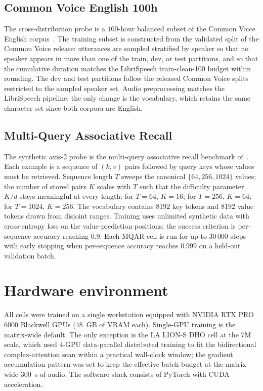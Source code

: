 \subsection{Common Voice English 100h}\label{app:setup:cv}

The cross-distribution probe is a $100$-hour balanced subset of the
Common Voice English corpus~\cite{ardila2019commonvoice}. The
training subset is constructed from the validated split of the
Common Voice release: utterances are sampled stratified by speaker
so that no speaker appears in more than one of the train, dev, or
test partitions, and so that the cumulative duration matches the
LibriSpeech train-clean-100 budget within rounding. The dev and test
partitions follow the released Common Voice splits restricted to the
sampled speaker set. Audio preprocessing matches the LibriSpeech
pipeline; the only change is the vocabulary, which retains the same
character set since both corpora are English.

\subsection{Multi-Query Associative Recall}\label{app:setup:mqar}

The synthetic axis-2 probe is the multi-query associative recall
benchmark of~\citet{arora2023zoology}. Each example is a sequence
of $(k, v)$ pairs followed by query keys whose values must be
retrieved. Sequence length $T$ sweeps the canonical $\{64, 256,
1024\}$ values; the number of stored pairs $K$ scales with $T$ such
that the difficulty parameter $K / d$ stays meaningful at every
length: for $T = 64$, $K = 16$; for $T = 256$, $K = 64$; for
$T = 1024$, $K = 256$. The vocabulary contains $8192$ key tokens
and $8192$ value tokens drawn from disjoint ranges. Training uses
unlimited synthetic data with cross-entropy loss on the
value-prediction positions; the success criterion is per-sequence
accuracy reaching $0.9$. Each MQAR cell is run for up to $30\,000$
steps with early stopping when per-sequence accuracy reaches
$0.999$ on a held-out validation batch.

\section{Hardware environment}\label{app:setup:hw}

All cells were trained on a single workstation equipped with NVIDIA
RTX PRO 6000 Blackwell GPUs ($48$~GB of VRAM each). Single-GPU
training is the matrix-wide default. The only exception is the LA
LION-S DHO cell at the 7M scale, which used 4-GPU data-parallel
distributed training to fit the bidirectional complex-attention
scan within a practical wall-clock window; the gradient
accumulation pattern was set to keep the effective batch budget at
the matrix-wide $300$~s of audio. The software stack consists of
PyTorch with CUDA acceleration.
